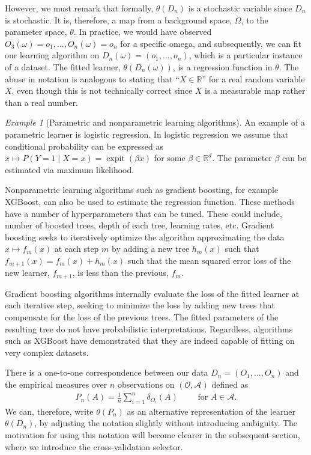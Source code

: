 \documentclass[11pt, a4paper]{article}
\theoremstyle{definition}
\theoremstyle{remark}
\newtheorem{example}{Example}
\newcommand{\btheta}{\theta}
\DeclareMathOperator{\expit}{expit}
\begin{document}
However, we must remark that formally, $ \btheta(D_n) $ is a stochastic variable since $ D_n $ is stochastic. It is, therefore, a map from a background space, $ \Omega $, to the parameter space, $ \btheta $. In practice, we would have observed $ O_3(\omega) = o_1, \dots, O_n(\omega) = o_n $ for a specific omega, and subsequently, we can fit our learning algorithm on $ D_n(\omega) = (o_1 , \dots , o_n) $, which is a particular instance of a dataset. The fitted learner, $ \btheta(D_n(\omega)) $, is a regression function in $ \btheta $. The abuse in notation is analogous to stating that ``$ X \in \mathbb{R} $'' for a real random variable $ X $, even though this is not technically correct since $ X $ is a measurable map rather than a real number.
\begin{example}[Parametric and nonparametric learning algorithms]
    An example of a parametric learner is logistic regression. In logistic regression we assume that conditional probability can be expressed as $ x \mapsto P(Y = 1 \mid X = x) = \expit( \beta x) $ for some $ \beta \in \mathbb{R}^{d} $. The parameter $ \beta $ can be estimated via maximum likelihood.   

    Nonparametric learning algorithms such as gradient boosting, for example XGBoost, can also be used to estimate the regression function. These methods have a number of hyperparameters that can be tuned. These could include, number of boosted trees, depth of each tree, learning rates, etc. Gradient boosting seeks to iteratively optimize the algorithm approximating the data $ x \mapsto f_m(x) $ at each step $ m $ by adding a new tree $ h_m(x) $ such that $ f_{m + 1}(x) = f_{m}(x) + h_{m}(x) $ such that the mean squared error loss of the new learner, $ f_{m + 1} $, is less than the previous, $ f_{m} $. \cite{chen2016xgboost}

    Gradient boosting algorithms internally evaluate the loss of the fitted learner at each iterative step, seeking to minimize the loss by adding new trees that compensate for the loss of the previous trees. The fitted parameters of the resulting tree do not have probabilistic interpretations. Regardless, algorithms such as XGBoost have demonstrated that they are indeed capable of fitting on very complex datasets.  
\end{example}
There is a one-to-one correspondence between our data $ D_n = (O_1 , \ldots, O_n) $ and the empirical measures over $ n $ observations on $ (\mathcal{O} , \mathcal{A}) $ defined as
\begin{align*}
    P_n(A) = \frac{1}{n} \sum_{i = 1}^{n} \delta_{O_i}(A)\qquad \text{ for } A \in \mathcal{A}.
\end{align*}
We can, therefore, write $ \btheta(P_n)$ as an alternative representation of the learner $\btheta(D_n)$, by adjusting the notation slightly without introducing ambiguity. The motivation for using this notation will become clearer in the subsequent section, where we introduce the cross-validation selector.
\end{document}
